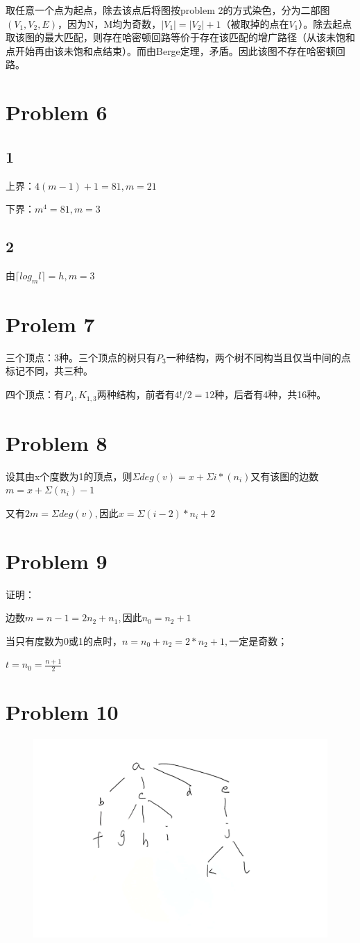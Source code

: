 \documentclass{article}
\begin{document}
取任意一个点为起点，除去该点后将图按problem 2的方式染色，分为二部图$(V_1,V_2,E)$，因为N，M均为奇数，$|V_1|=|V_2|+1$（被取掉的点在$V_1$）。除去起点取该图的最大匹配，则存在哈密顿回路等价于存在该匹配的增广路径（从该未饱和点开始再由该未饱和点结束）。而由Berge定理，矛盾。因此该图不存在哈密顿回路。

\section*{Problem 6}
\subsection*{1}
上界：$4(m-1)+1 = 81,m=21$

下界：$m^4=81,m=3$

\subsection*{2}
由$\lceil log_ml\rceil = h,m=3$

\section*{Prolem 7}
三个顶点：3种。三个顶点的树只有$P_3$一种结构，两个树不同构当且仅当中间的点标记不同，共三种。

四个顶点：有$P_4,K_{1,3}$两种结构，前者有$4!/2=12$种，后者有4种，共16种。

\section*{Problem 8}
设其由x个度数为1的顶点，则$\Sigma deg(v) = x+\Sigma i*(n_i)$又有该图的边数$m = x+\Sigma (n_i)-1$

又有$2m = \Sigma deg(v),$因此$x = \Sigma(i-2)*n_i+2$
\section*{Problem 9}
证明：

边数$m=n-1=2n_2+n_1,$因此$n_0=n_2+1$

当只有度数为0或1的点时，$n=n_0+n_2=2*n_2+1,$一定是奇数；

$t=n_0=\frac{n+1}{2}$


\section*{Problem 10}

\begin{figure}[H]
    \centering
    \includegraphics[scale=0.2]{p2.jpg}
\end{figure}
\end{document}
